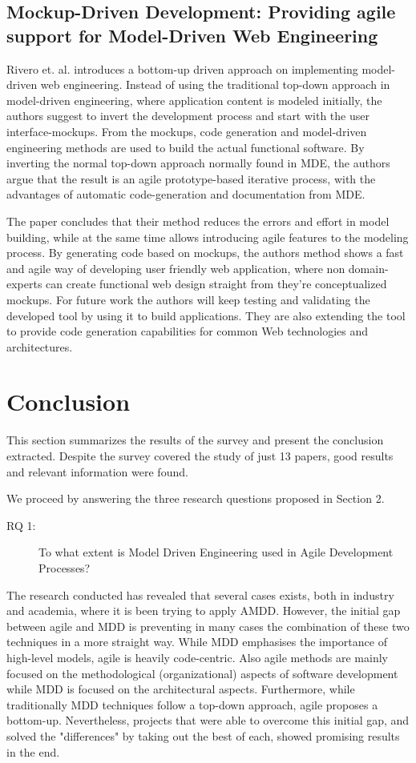 \documentclass[10pt, a4paper, twocolumn]{article}
\begin{document}
\subsection{Mockup-Driven Development: Providing agile support for Model-Driven Web Engineering}

Rivero et. al. \cite{RIVERO2014670} introduces a bottom-up driven approach on implementing model-driven web engineering. Instead of using the traditional top-down approach in model-driven engineering, where application content is modeled initially, the authors suggest to invert the development process and start with the user interface-mockups. From the mockups, code generation and model-driven engineering methods are used to build the actual functional software. By inverting the normal top-down approach normally found in MDE, the authors argue that the result is an agile prototype-based iterative process, with the advantages of automatic code-generation and documentation from MDE. 

The paper concludes that their method reduces the errors and effort in model building, while at the same time allows introducing agile features to the modeling process. By generating code based on mockups, the authors method shows a fast and agile way of developing user friendly web application, where non domain-experts can create functional web design straight from they’re conceptualized mockups. For future work the authors will keep testing and validating the developed tool by using it to build applications. They are also extending the tool to provide code generation capabilities for common Web technologies and architectures.


\section{Conclusion}

This section summarizes the results of the survey and present the conclusion extracted.
Despite the survey covered the study of just 13 papers, good results and relevant information were found.

We proceed by answering the three research questions proposed in Section 2.

\begin{description}
	\item[RQ 1:] To what extent is Model Driven Engineering used in Agile Development Processes?
\end{description}
The research conducted has revealed that several cases exists, both in industry and academia, where it is been trying to apply AMDD.
However, the initial gap between agile and MDD is preventing in many cases the combination of these two techniques in a more straight way.
While MDD emphasises the importance of high-level models, agile is heavily code-centric.
Also agile methods are mainly focused on the methodological (organizational) aspects of software development while MDD is focused on the architectural aspects.
Furthermore, while traditionally MDD techniques follow a top-down approach, agile proposes a bottom-up.
Nevertheless, projects that were able to overcome this initial gap, and solved the "differences" by taking out the best of each, showed promising results in the end.
\end{document}
